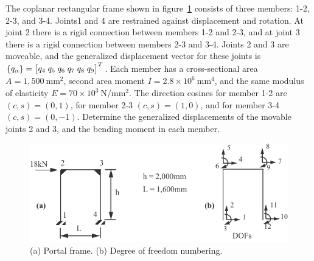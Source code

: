 \documentclass{AeroStructure-ERJohnson}
\begin{document}
\begin{example}\label{ex16.8}The coplanar rectangular frame shown in figure~\ref{fig16.24} consists of three members: 1-2, 2-3, and 3-4. Joints1 and 4 are restrained against displacement and rotation. At joint 2 there is a rigid connection between members 1-2 and 2-3, and at joint 3 there is a rigid connection between members 2-3 and 3-4. Joints 2 and 3 are moveable, and the generalized displacement vector for these joints is $\left\{q_{\alpha}\right\}=\left[\begin{array}{@{}l@{\;}l@{\;}l@{\;}l@{\;}l@{\;}l@{}}q_{4} & q_{5} & q_{6} & q_{7} & q_{8} & q_{9}\end{array}\right]^{T}$. Each member has a cross-sectional area $A=1,500 \mathrm{~mm}^{2}$, second area moment $I=2.8 \times 10^{6} \mathrm{~mm}^{4}$, and the same modulus of elasticity $E=70 \times 10^{3} \mathrm{~N}/ \mathrm{mm}^{2}$. The direction cosines for member 1-2 are $(c, s)=(0,1)$, for member 2-3 $(c, s)=(1,0)$, and for member 3-4 $(c, s)=(0,-1)$. Determine the generalized displacements of the movable joints 2 and 3, and the bending moment in each member.

\begin{figure}[!h]
\vspace*{-2pc}
\centerline{\includegraphics{Figure_16-24.pdf}}
\caption{(a) Portal frame. (b) Degree of freedom numbering.}\label{fig16.24}
\vspace*{-1.2pc}
\end{figure}


\end{example}
\end{document}
